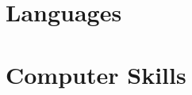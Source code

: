 \documentclass[10pt,a4paper,sans]{moderncv}
\begin{document}
\section{Languages}


\section{Computer Skills}


\clearpage
\end{document}
